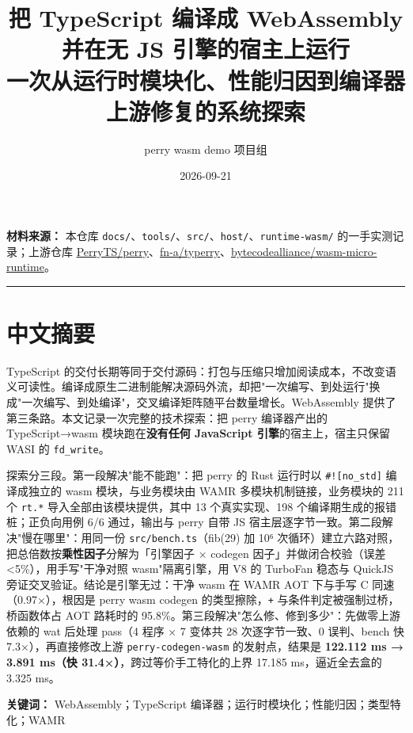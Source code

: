 \documentclass[11pt, a4paper]{article}
\title{把 TypeScript 编译成 WebAssembly 并在无 JS 引擎的宿主上运行\\[0.4em]
\large 一次从运行时模块化、性能归因到编译器上游修复的系统探索}
\date{2026-09-21}
\author{perry wasm demo 项目组}
\begin{document}
\maketitle
\thispagestyle{empty}






\noindent\textbf{材料来源：} 本仓库 \texttt{docs/}、\texttt{tools/}、\texttt{src/}、\texttt{host/}、\texttt{runtime-wasm/} 的一手实测记录；上游仓库 \href{https://github.com/PerryTS/perry}{PerryTS/perry}、\href{https://github.com/fn-a/typerry}{fn-a/typerry}、\href{https://github.com/bytecodealliance/wasm-micro-runtime}{bytecodealliance/wasm-micro-runtime}。


\bigskip\hrule\bigskip

\section{中文摘要}

TypeScript 的交付长期等同于交付源码：打包与压缩只增加阅读成本，不改变语义可读性。编译成原生二进制能解决源码外流，却把"一次编写、到处运行"换成"一次编写、到处编译"，交叉编译矩阵随平台数量增长。WebAssembly 提供了第三条路。本文记录一次完整的技术探索：把 perry 编译器产出的 TypeScript→wasm 模块跑在\textbf{没有任何 JavaScript 引擎}的宿主上，宿主只保留 WASI 的 \texttt{fd\_write}。


探索分三段。第一段解决"能不能跑"：把 perry 的 Rust 运行时以 \texttt{\#![no\_std]} 编译成独立的 wasm 模块，与业务模块由 WAMR 多模块机制链接，业务模块的 211 个 \texttt{rt.*} 导入全部由该模块提供，其中 13 个真实实现、198 个编译期生成的报错桩；正负向用例 6/6 通过，输出与 perry 自带 JS 宿主层逐字节一致。第二段解决"慢在哪里"：用同一份 \texttt{src/bench.ts}（fib(29) 加 10⁶ 次循环）建立六路对照，把总倍数按\textbf{乘性因子}分解为「引擎因子 × codegen 因子」并做闭合校验（误差 <5\%），用手写"干净对照 wasm"隔离引擎，用 V8 的 TurboFan 稳态与 QuickJS 旁证交叉验证。结论是引擎无过：干净 wasm 在 WAMR AOT 下与手写 C 同速（0.97×），根因是 perry wasm codegen 的类型擦除，\texttt{+} 与条件判定被强制过桥，桥函数体占 AOT 路耗时的 95.8\%。第三段解决"怎么修、修到多少"：先做零上游依赖的 wat 后处理 pass（4 程序 × 7 变体共 28 次逐字节一致、0 误判、bench 快 7.3×），再直接修改上游 \texttt{perry-codegen-wasm} 的发射点，结果是 \textbf{122.112 ms → 3.891 ms（快 31.4×）}，跨过等价手工特化的上界 17.185 ms，逼近全去盒的 3.325 ms。


\textbf{关键词：} WebAssembly；TypeScript 编译器；运行时模块化；性能归因；类型特化；WAMR
\end{document}
